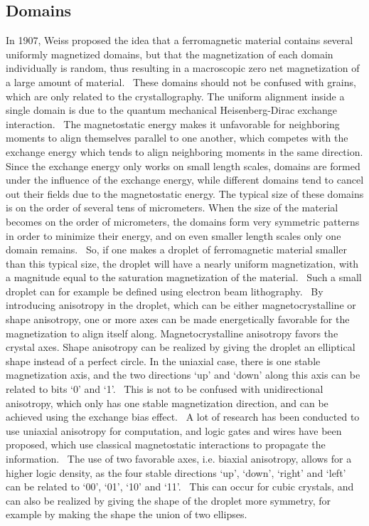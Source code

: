 \documentclass[10pt,a4paper]{article}
\begin{document}
\subsection{Domains}
In 1907, Weiss proposed the idea that a ferromagnetic material contains several uniformly magnetized domains, but that the magnetization of each domain individually is random, thus resulting in a macroscopic zero net magnetization of a large amount of material.~\cite{MuMax3_advances} These domains should not be confused with grains, which are only related to the crystallography. The uniform alignment inside a single domain is due to the quantum mechanical Heisenberg-Dirac exchange interaction.~\cite{MuMax3_advances, heisenberg1928theorie} The magnetostatic energy makes it unfavorable for neighboring moments to align themselves parallel to one another, which competes with the exchange energy which tends to align neighboring moments in the same direction. Since the exchange energy only works on small length scales, domains are formed under the influence of the exchange energy, while different domains tend to cancel out their fields due to the magnetostatic energy. The typical size of these domains is on the order of several tens of micrometers. When the size of the material becomes on the order of micrometers, the domains form very symmetric patterns in order to minimize their energy, and on even smaller length scales only one domain remains.~\cite{NML_Carlton} So, if one makes a droplet of ferromagnetic material smaller than this typical size, the droplet will have a nearly uniform magnetization, with a magnitude equal to the saturation magnetization of the material.~\cite{NML_Carlton} Such a small droplet can for example be defined using electron beam lithography.~\cite{MQCA_RoomTemp, NML_Carlton} By introducing anisotropy in the droplet, which can be either magnetocrystalline or shape anisotropy, one or more axes can be made energetically favorable for the magnetization to align itself along. Magnetocrystalline anisotropy favors the crystal axes. Shape anisotropy can be realized by giving the droplet an elliptical shape instead of a perfect circle. In the uniaxial case, there is one stable magnetization axis, and the two directions `up' and `down' along this axis can be related to bits `0' and `1'.~\cite{MQCA_RoomTemp} This is not to be confused with unidirectional anisotropy, which only has one stable magnetization direction, and can be achieved using the exchange bias effect.~\cite{ExchangeBias_Mechanisms,ExchangeBias_nanostructures,ExchangeBias} A lot of research has been conducted to use uniaxial anisotropy for computation, and logic gates and wires have been proposed, which use classical magnetostatic interactions to propagate the information.~\cite{GYP-18,MQCA_MajorityGate,SwitchingForced_EnergyEfficient} The use of two favorable axes, i.e. biaxial anisotropy, allows for a higher logic density, as the four stable directions `up', `down', `right' and `left' can be related to `00', `01', `10' and `11'.~\cite{MQCA_ImageRecognition} This can occur for cubic crystals, and can also be realized by giving the shape of the droplet more symmetry, for example by making the shape the union of two ellipses.
\end{document}
